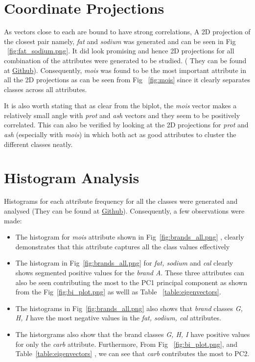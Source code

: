 \documentclass[preprint,12pt]{elsarticle}
\begin{document}
\section{Coordinate Projections}
\label{ss:CoordinateProjections}
 As vectors close to each are bound to have strong correlations, A 2D projection of the closest
pair namely, \textit{fat} and \textit{sodium} was generated and can be seen in Fig ~\ref{fig:fat_sodium.png}. It did look promising and hence 2D projections for all
combination of the attributes were generated to be studied. ( They can be found at \href{https://github.com/amar-laksh/UNI/tree/master/assignments/IDA/assignment/gen_images/attributes}{Github}). Consequently, \textit{mois} was found to be the most important attribute in all the 2D projections as can be seen from Fig ~\ref{fig:mois} since it clearly separates classes across all attributes.
\par
It is also worth stating that as clear from the biplot, the \textit{mois }vector makes a relatively small angle with \textit{prot }and \textit{ash }vectors and they seem to be positively
correlated. This can also be verified by looking at the 2D projections for \textit{prot} and \textit{ash} (especially with \textit{mois}) in which both act as good attributes to cluster the different classes neatly.
\section{Histogram Analysis}
\label{ss:HistogramAnalysis}
Histograms for each attribute frequency for all the classes were generated and analysed (They can be found at \href{https://github.com/amar-laksh/UNI/tree/master/assignments/IDA/assignment/gen_images/histograms}{Github}). Consequently, a few observations were made:
\begin{itemize}
\item The histogram for \textit{mois} attribute shown in Fig~\ref{fig:brands_all.png} , clearly demonstrates that this attribute captures all the class values effectively
\item The histogram in Fig~\ref{fig:brands_all.png} for \textit{fat, sodium }and \textit{cal} clearly shows segmented positive values for the \textit{brand A}. These three attributes can also be seen contributing the most to the PC1 principal component as shown from the Fig~\ref{fig:bi_plot.png} as welll as Table ~\ref{table:eigenvectors}.
\item The histograms in Fig~\ref{fig:brands_all.png} also shows that \textit{brand} classes \textit{G, H, I} have the most negative values in the \textit{fat, sodium, cal} attributes. \item The historgrams also show that the brand classes \textit{G, H, I} have positive values  for only the \textit{carb }attribute. Furthermore, From Fig ~\ref{fig:bi_plot.png},  and  Table~\ref{table:eigenvectors} , we can see that \textit{carb }  contributes the most to PC2.
\end{itemize}
\end{document}
